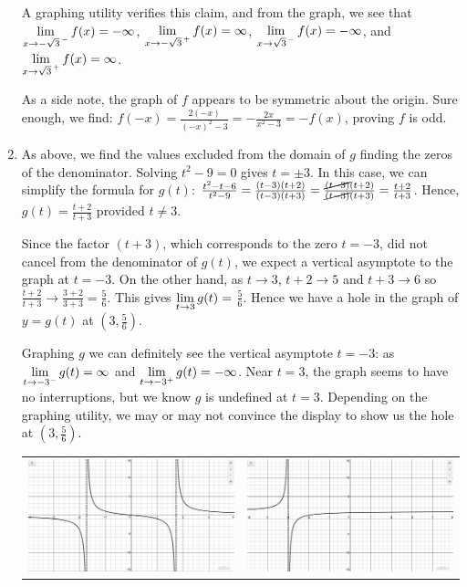 \documentclass{ximera}
\begin{document}
\begin{ex}
\begin{enumerate}
A graphing utility verifies this claim, and from the graph, we see that  $\ds{\lim_{x \rightarrow -\sqrt{3}^{\, -}} f(x) = -\infty}$, $\ds{\lim_{x \rightarrow -\sqrt{3}^{\, +}} f(x) = \infty}$, $\ds{\lim_{x \rightarrow \sqrt{3}^{\, -}} f(x) = -\infty}$, and $\ds{\lim_{x \rightarrow \sqrt{3}^{\, +}} f(x) = \infty}$.

As a side note, the graph of $f$ appears to be symmetric about the origin.  Sure enough, we find: $f(-x) = \frac{2(-x)}{(-x)^2-3} = -\frac{2x}{x^2-3} = -f(x)$, proving $f$ is odd.

\item  As above, we find the values excluded from the domain of $g$ finding the zeros of the denominator.  Solving $t^2 - 9 = 0$ gives $t = \pm 3$.  In this case, we can simplify the formula for $g(t)$:  $\frac{t^2-t-6}{t^2-9} = \frac{(t-3)(t+2)}{(t-3)(t+3)} =\frac{\cancel{(t-3)}(t+2)}{\cancel{(t-3)}(t+3)} =  \frac{t+2}{t+3}$.   Hence, $g(t) = \frac{t+2}{t+3}$ provided $t \neq 3$.  

Since the factor $(t+3)$, which corresponds to the zero $t = -3$, did not cancel from the denominator of $g(t)$, we expect a vertical asymptote to the graph at $t = -3$.  On the other hand, as $t \rightarrow 3$, $t+2 \rightarrow 5$ and $t+3 \rightarrow 6$ so $\frac{t+2}{t+3} \rightarrow \frac{3+2}{3+3} = \frac{5}{6}$.  This gives $\ds{\lim_{t \rightarrow 3} g(t)} =$  $\frac{5}{6}$.   Hence we have a hole in the graph of $y = g(t)$ at  $\left(3, \frac{5}{6}\right)$.

 Graphing $g$ we can definitely see the vertical asymptote $t=-3$:  as  $\ds{\lim_{t \rightarrow -3^{-}} g(t) = \infty}$ and $\ds{\lim_{t \rightarrow -3^{+}} g(t) = -\infty}$.  Near $t=3$, the graph seems to have no interruptions, but we know $g$ is undefined at $t=3$.  Depending on the graphing utility, we may or may not convince the display to show us the hole at $\left(3, \frac{5}{6}\right)$.

\begin{center}

\begin{tabular}{cc}

\includegraphics[width=3in]{./IntroRationalGraphics/VAorHoleEx01.jpg} & \includegraphics[width=3in]{./IntroRationalGraphics/VAorHoleEx02.jpg} \\


\end{tabular}
\end{center}
\end{enumerate}
\end{ex}
\end{document}
